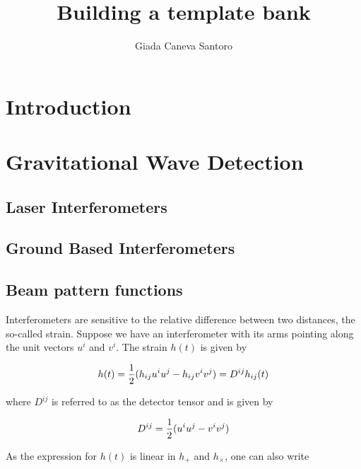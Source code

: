 \documentclass[binding=0.6cm, LaM]{sapthesis}
\title{Building a template bank}
\author{Giada Caneva Santoro}
\begin{document}
\frontmatter
\maketitle
\dedication{Fortsett å gå.}


\tableofcontents

\mainmatter 




\chapter{Introduction}

\chapter{Gravitational Wave Detection}



\section{Laser Interferometers}



\section{Ground Based Interferometers}



\section{Beam pattern functions}

	Interferometers are sensitive to the relative difference between two distances, the so-called strain.
 	Suppose we have an interferometer with its arms pointing along the unit vectors $u^i$ and $v^i$. The strain $h(t)$ is given by

		\begin{equation}
		h(t) = {1 \over 2} (h_{ij}u^iu^j - h_{ij}v^iv^j) = D^{ij}h_{ij}(t)
		\end{equation}

	where $D^{ij}$ is referred to as the detector tensor and is given by

		\begin{equation}
		D^{ij} = {1\over 2} (u^iu^j -v^iv^j)
		\end{equation}

	As the expression for $h(t)$ is linear in $h_{+}$ and $h_{\times}$, one can also write
\end{document}

